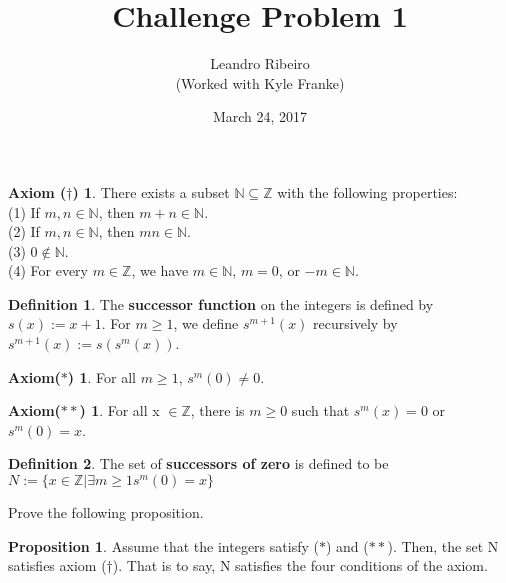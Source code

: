 \documentclass[12pt]{amsart}
\newcommand{\N}{\mathbb{N}}
\newcommand{\Z}{\mathbb{Z}}
\begin{document}
\title{Challenge Problem 1}
\date{March 24, 2017}
\author{Leandro Ribeiro\\(Worked with Kyle Franke)}

\maketitle

\theoremstyle{definition}
\newtheorem*{axD}{Axiom ($\dagger$)}
\begin{axD}
	There exists a subset $\N \subseteq \Z$ with the following properties:
	\\\indent(1) If $m,n \in \N$, then $m + n \in \N$.
	\\\indent(2) If $m,n \in \N$, then $mn \in \N$.
	\\\indent(3) $0 \notin \N$.
	\\\indent(4) For every $m \in \Z$, we have $m \in \N$, $m = 0$, or $- m \in \N$.
\end{axD}

\newtheorem*{definition}{Definition}
\begin{definition}
The \textbf{successor function} on the integers is defined by $s(x) :=
x + 1$. For $m \geq 1$, we define $s^{m+1}(x)$ recursively by $s^{m+1}(x) := s(s^{m}(x))$.
\end{definition}

\newtheorem*{ax1}{Axiom($\ast$)}
\begin{ax1}
For all $m \geq 1$, $s^{m}(0) \neq 0$.\vspace{2mm}
\end{ax1}

\newtheorem*{ax2}{Axiom($\ast\ast$)}
\begin{ax2}
	For all x $\in \Z$, there is $m \geq 0$ such that $s^m(x) = 0$ or $s^m(0) = x$.
\end{ax2}
\begin{definition}
	The set of \textbf{successors of zero} is defined to be \center$N := \{x \in \Z | \exists m \geq 1 s^m(0) = x\}$\vspace*{1.5mm}
\end{definition}
\noindent\hspace*{5mm} Prove the following proposition.\vspace*{1.5mm}

\theoremstyle{proposition}
\newtheorem*{proposition}{Proposition}
\begin{proposition}
	Assume that the integers satisfy \textnormal{($\ast$)} and \textnormal{($\ast\ast$)}. Then, the set
	N satisfies axiom \textnormal{($\dagger$)}. That is to say, N satisfies the four conditions of the
axiom.
\end{proposition}
\end{document}
